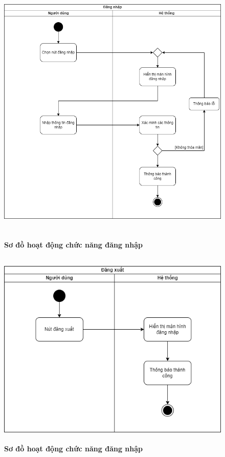  \begin{figure}[H]
    \centering
    \includegraphics[width=13.5cm,height=13cm]{Images/acitivity/activity_login.png}
    \caption[Sơ đồ hoạt động chức năng đăng nhập]{\bfseries \fontsize{12pt}{0pt}
    \selectfont Sơ đồ hoạt động chức năng đăng nhập}
    \label{activity_login} %
  \end{figure}

  \begin{figure}[H]
    \centering
    \includegraphics[width=11.5cm,height=9.5cm]{Images/acitivity/activity_logout.png}
    \caption[Sơ đồ hoạt động chức năng đăng nhập]{\bfseries \fontsize{12pt}{0pt}
    \selectfont Sơ đồ hoạt động chức năng đăng nhập}
    \label{activity_logout} %
  \end{figure}

